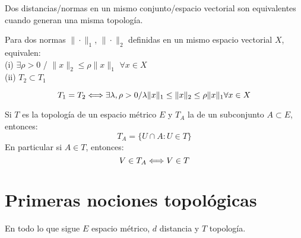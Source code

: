    \begin{definicion}
        Dos distancias/normas en un mismo conjunto/espacio vectorial son equivalentes cuando generan una misma topología. 
    \end{definicion}
    \begin{prop} 
        Para dos normas $\|\cdot \|_1$, $\|\cdot \|_2$ definidas en un mismo espacio vectorial $X$, equivalen: \\
        
        (i)  $\exists \rho >0$ / $\|x\|_2 \leq \rho \|x\|_1$  $\forall x \in X$ \\
        
        (ii)  $T_2 \subset T_1$
    \end{prop}

    
    \begin{coro}
        $$T_1 = T_2 \\ \Longleftrightarrow \\ \exists \lambda, \rho >0 \\ /\\ \lambda \|x\|_1 \leq \|x\|_2 \leq \rho \|x\|_1 \\  \forall x \in X$$
    \end{coro}
    
    \begin{definicion}
        Si $T$ es la topología de un espacio métrico $E$ y $T_A$ la de un subconjunto $A \subset E$, entonces: \\
        $$T_A = \{ U\cap A : U \in T\}$$
        En particular si $A\in T$, entonces:
        $$V \in T_A \\ \Longleftrightarrow \\ V \in T$$
    \end{definicion}

\section{Primeras nociones topológicas}
    En todo lo que sigue $E$ espacio métrico, $d$ distancia y $T$ topología.


